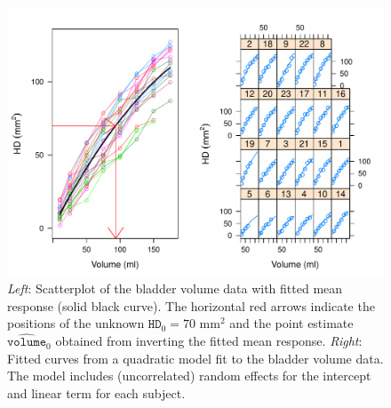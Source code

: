 \documentclass[cmfont,usenames,dvipsnames,leqno]{afit-etd}\usepackage[]{graphicx}\usepackage[]{color}
\makeatletter
\def\maxwidth{ %
  \ifdim\Gin@nat@width>\linewidth
    \linewidth
  \else
    \Gin@nat@width
  \fi
}
\newenvironment{knitrout}{}{} %
\renewenvironment{knitrout}{\begin{singlespace}}{\end{singlespace}}
\newcommand{\wh}[1]{\ensuremath{\widehat{#1}}}
\makeatother
\begin{document}
\begin{knitrout}
\color{fgcolor}\begin{figure}[H]

\includegraphics[width=\maxwidth]{figure/bladder-fit} \caption[Scatterplot of the bladder volume data with fitted mean response]{\textit{Left}: Scatterplot of the bladder volume data with fitted mean response (solid black curve). The horizontal red arrows indicate the positions of the unknown $\texttt{HD}_0 = 70 \text{ mm}^2$ and the point estimate $\wh{\texttt{volume}}_0$ obtained from inverting the fitted mean response. \textit{Right}: Fitted curves from a quadratic model fit to the bladder volume data. The model includes (uncorrelated) random effects for the intercept and linear term for each subject.\label{fig:bladder-fit}}
\end{figure}


\end{knitrout}
\end{document}
